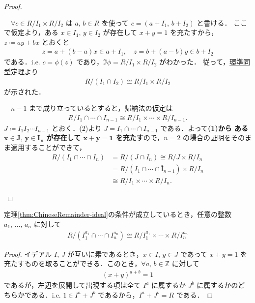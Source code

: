 \documentclass[geometry_main]{subfiles}
\begin{document}
\begin{proof}
\begin{enumerate}
		　$\forall c \in R/I_1 \times R/I_2$ は $a,\, b \in R$ を使って $c = (a + I_1,\, b + I_2)$ と書ける．
		ここで仮定より，ある $x \in I_1,\, y \in I_2$ が存在して $x + y = 1$ を充たすから，$z \coloneqq ay+bx$ とおくと
		\begin{align}
			z = a + (b-a)x \in a + I_1,\quad z = b + (a-b)y \in b + I_2
		\end{align}
		である．i.e. $c = \phi(z)$ であり，$\Im \phi = R/I_1 \times R/I_2$ がわかった．
		従って，\hyperref[thm.homo1]{環準同型定理}より
		\begin{align}
			R/(I_1 \cap I_2) \cong R/I_1 \times R/I_2
		\end{align}
		が示された．
		
		　$n-1$ まで成り立っているとすると，帰納法の仮定は
		\begin{align}
			R/I_1 \cap \cdots \cap I_{n-1} \cong  R/I_1 \times \cdots \times R/I_{n-1}.
		\end{align}
		$J \coloneqq I_1I_2 \cdots I_{n-1}$ とおく．(2)より $J = I_1 \cap \cdots \cap I_{n-1}$ である．よって\textbf{(1)から
		ある $\bm{x \in J,\, y \in I_n}$ が存在して $\bm{x + y = 1}$ を充たす}ので，$n=2$ の場合の証明をそのまま適用することができて，
		\begin{align}
			R/(I_1 \cap \cdots \cap I_n) &= R/(J \cap I_n) \cong R/J \times R/I_n \\
			&= R/(I_1 \cap \cdots \cap Î_{n-1}) \times R/I_n \\
			&\cong R/I_1 \times \cdots \times R/I_n.
		\end{align}
	\end{enumerate}
	
\end{proof}

\begin{mycol}[]{}
	定理\ref{thm:ChineseRemainder-ideal}の条件が成立しているとき，任意の整数 $a_1,\, \dots ,\, a_n$ に対して
	\begin{align}
		R/(I_1^{a_1} \cap \cdots \cap I_n^{a_n}) \cong R/I_1^{a_1} \times \cdots \times R/I_n^{a_n}
	\end{align}
\end{mycol}
\begin{proof}
	イデアル $I,\, J$ が互いに素であるとき，$x \in I,\, y \in J$ であって $x + y = 1$ を充たすものを取ることができる．このとき，$\forall a,\, b \in \mathbb{Z}$ に対して
	\begin{align}
		(x+y)^{a+b} = 1
	\end{align}
	であるが，左辺を展開して出現する項は全て $I^a$ に属するか $J^b$ に属するかのどちらかである．i.e.  $1 \in I^a + J^b$ であるから，$I^a + J^b = R$ である．
\end{proof}
\end{document}
